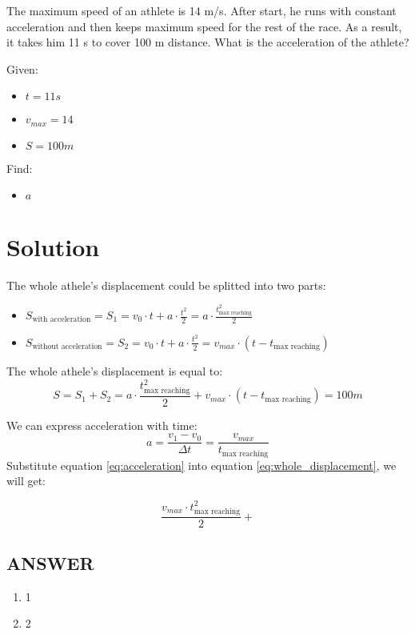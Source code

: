 
The maximum speed of an athlete is 14 m/s. After start, he runs with constant acceleration and
then keeps maximum speed for the rest of the race. As a result, it takes him 11 s to cover 100 m
distance. What is the acceleration of the athlete?

\bigbreak Given:

\begin{itemize}
    \item $t = 11s$
    \item $v_{max} = 14$
    \item $S = 100m$
\end{itemize}

\bigbreak Find:

\begin{itemize}
    \item $a$
\end{itemize}

\section*{Solution}

The whole athele's displacement could be splitted into two parts:

\begin{itemize}
    \item $S_{\text{with acceleration}} = S_1 = v_0 \cdot t + a \cdot \frac{t^2}{2} = a \cdot \frac{t_{\text{max reaching}}^2}{2}$
    \item $ S_{\text{without acceleration}} = S_2 = v_0 \cdot t + a \cdot \frac{t^2}{2} = v_{max} \cdot (t - t_{\text{max reaching}})$
\end{itemize}

The whole athele's displacement is equal to:
\begin{equation}
    \label{eq:whole_displacement}
    S = S_1 + S_2 = a \cdot \frac{t_{\text{max reaching}}^2}{2} + v_{max} \cdot (t - t_{\text{max reaching}}) = 100m
\end{equation}

We can express acceleration with time:
\begin{equation}
    \label{eq:acceleration}
    a = \frac{v_1 - v_0}{\Delta t} = \frac{v_{max}}{t_{\text{max reaching}}}
\end{equation}
Substitute equation \ref{eq:acceleration} into equation \ref{eq:whole_displacement}, we will get:

$$\frac{v_{max} \cdot t_{\text{max reaching}}^2}{2} + $$


\vfill \subsection*{ANSWER}
\begin{enumerate}
    \item 1
    \item 2
\end{enumerate}
